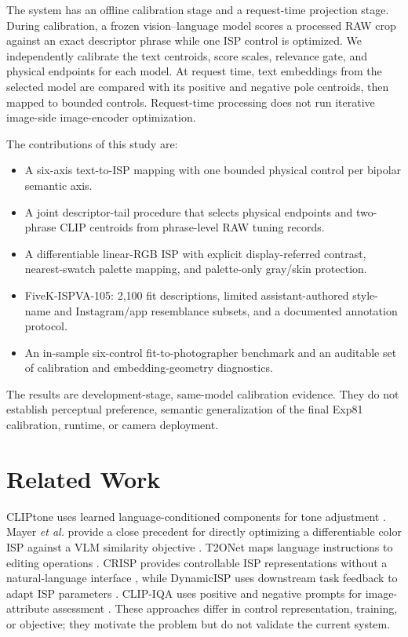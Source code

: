 \documentclass[journal]{IEEEtran}
\begin{document}
The system has an offline calibration stage and a request-time projection stage. During calibration, a frozen vision--language model scores a processed RAW crop against an exact descriptor phrase while one ISP control is optimized. We independently calibrate the text centroids, score scales, relevance gate, and physical endpoints for each model. At request time, text embeddings from the selected model are compared with its positive and negative pole centroids, then mapped to bounded controls. Request-time processing does not run iterative image-side image-encoder optimization.

The contributions of this study are:
\begin{itemize}
    \item A six-axis text-to-ISP mapping with one bounded physical control per bipolar semantic axis.
    \item A joint descriptor-tail procedure that selects physical endpoints and two-phrase CLIP centroids from phrase-level RAW tuning records.
    \item A differentiable linear-RGB ISP with explicit display-referred contrast, nearest-swatch palette mapping, and palette-only gray/skin protection.
    \item FiveK-ISPVA-105: 2,100 fit descriptions, limited assistant-authored style-name and Instagram/app resemblance subsets, and a documented annotation protocol.
    \item An in-sample six-control fit-to-photographer benchmark and an auditable set of calibration and embedding-geometry diagnostics.
\end{itemize}

The results are development-stage, same-model calibration evidence. They do not establish perceptual preference, semantic generalization of the final Exp81 calibration, runtime, or camera deployment.

\section{Related Work}
CLIPtone uses learned language-conditioned components for tone adjustment \cite{lee2024cliptone}. Mayer \emph{et al.} provide a close precedent for directly optimizing a differentiable color ISP against a VLM similarity objective \cite{mayer2025language}. T2ONet maps language instructions to editing operations \cite{shi2021t2onet}. CRISP provides controllable ISP representations without a natural-language interface \cite{kimlee2024crisp}, while DynamicISP uses downstream task feedback to adapt ISP parameters \cite{yoshimura2023dynamicisp}. CLIP-IQA uses positive and negative prompts for image-attribute assessment \cite{wang2023clipiqa}. These approaches differ in control representation, training, or objective; they motivate the problem but do not validate the current system.
\end{document}

